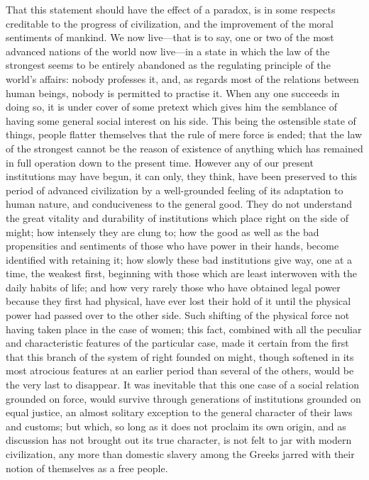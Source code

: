 \documentclass[12pt]{report}
\begin{document}
That this statement should have the effect of a paradox, is in some respects creditable to the progress of civilization, and the improvement of the moral sentiments of mankind. We now live—that is to say, one or two of the most advanced nations of the world now live—in a state in which the law of the strongest seems to be entirely abandoned as the regulating principle of the world's affairs: nobody professes it, and, as regards most of the relations between human beings, nobody is permitted to practise it. When any one succeeds in doing so, it is under cover of some pretext which gives him the semblance of having some general social interest on his side. This being the ostensible state of things, people flatter themselves that the rule of mere force is ended; that the law of the strongest cannot be the reason of existence of anything which has remained in full operation down to the present time. However any of our present institutions may have begun, it can only, they think, have been preserved to this period of advanced civilization by a well-grounded feeling of its adaptation to human nature, and conduciveness to the general good. They do not understand the great vitality and durability of institutions which place right on the side of might; how intensely they are clung to; how the good as well as the bad propensities and sentiments of those who have power in their hands, become identified with retaining it; how slowly these bad institutions give way, one at a time, the weakest first, beginning with those which are least interwoven with the daily habits of life; and how very rarely those who have obtained legal power because they first had physical, have ever lost their hold of it until the physical power had passed over to the other side. Such shifting of the physical force not having taken place in the case of women; this fact, combined with all the peculiar and characteristic features of the particular case, made it certain from the first that this branch of the system of right founded on might, though softened in its most atrocious features at an earlier period than several of the others, would be the very last to disappear. It was inevitable that this one case of a social relation grounded on force, would survive through generations of institutions grounded on equal justice, an almost solitary exception to the general character of their laws and customs; but which, so long as it does not proclaim its own origin, and as discussion has not brought out its true character, is not felt to jar with modern civilization, any more than domestic slavery among the Greeks jarred with their notion of themselves as a free people.
\end{document}
